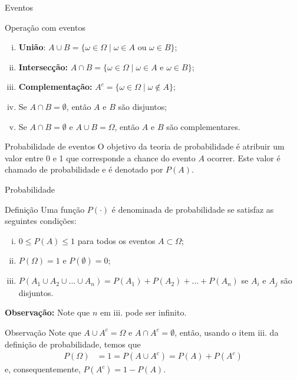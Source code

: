 \documentclass[9pt]{beamer}
\begin{document}
\begin{frame}{Eventos}

\begin{block}{Operação com eventos}
	\begin{enumerate}[i.]
		\item \textbf{União}: $A \cup B = \{\omega \in \Omega \mid \omega \in A \mbox{ ou } \omega \in B \}$;
		\item \textbf{Intersecção:} $A \cap B = \{ \omega \in \Omega \mid \omega \in A \mbox{ e } \omega \in B \}$;
		\item \textbf{Complementação:} $A^c =\{ \omega \in \Omega \mid \omega \not\in A \}$;
		\item Se $A \cap B = \emptyset$, então $A$ e $B$ são disjuntos;
		\item Se $A \cap B = \emptyset$ e $A \cup B = \Omega$, então $A$ e $B$ são complementares.
	\end{enumerate}
\end{block}

\begin{block}{Probabilidade de eventos}
	O objetivo  da teoria de probabilidade é atribuir um valor entre 0 e 1 que corresponde a chance do evento $A$ ocorrer. Este valor é chamado de probabilidade e é denotado por $P(A)$.
\end{block}
\end{frame}

\begin{frame}{Probabilidade}

	{
	\begin{block}{Definição}
		Uma função $P(\cdot)$ é denominada de probabilidade se satisfaz as seguintes condições:
		\begin{enumerate}[i.]
			\item $0 \leq P(A) \leq 1$ para todos os eventos $A \subset \Omega$;
			\item $P(\Omega)=1$ e $P(\emptyset)=0$;
			\item $P\left(A_1 \cup A_2 \cup \dots \cup A_n \right) = P(A_1) + P(A_2) + \dots + P(A_n)$ se $A_i$ e $A_j$ são disjuntos. 
		\end{enumerate}
		\textbf{Observação: } Note que $n$ em {\color{blue} iii.} pode ser infinito.
	\end{block}
	
	\begin{block}{Observação}
	 Note que $A\cup A^c = \Omega$ e $A \cap A^c =\emptyset $, então, usando o item {\color{blue} iii.}  da definição de probabilidade, temos que
		\begin{align*}
		P(\Omega) &= 1 = P(A \cup A^c) = P(A) + P(A^c)
		\end{align*}
		e, consequentemente, $P(A^c) = 1 - P(A)$.
	\end{block}

	}
\end{frame}
\end{document}
